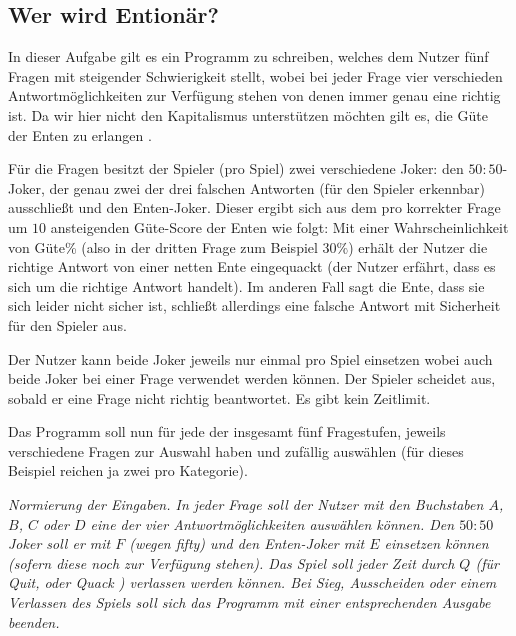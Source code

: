 \documentclass[table]{sopra-base}
\begin{document}
\subsection{Wer wird Entionär?}

In dieser Aufgabe gilt es ein Programm zu schreiben, welches dem Nutzer fünf Fragen mit steigender Schwierigkeit stellt, wobei bei jeder Frage vier verschieden Antwortmöglichkeiten zur Verfügung stehen
von denen immer genau eine richtig ist. Da wir hier nicht den Kapitalismus unterstützen möchten gilt es, die Güte der Enten zu erlangen \Tongey.\par{}
Für die Fragen besitzt der Spieler (pro Spiel) zwei verschiedene Joker: den $50:50$-Joker, der genau zwei der drei falschen Antworten (für den Spieler erkennbar) ausschließt und den Enten-Joker. Dieser ergibt sich aus dem pro korrekter Frage um $10$ ansteigenden Güte-Score der Enten wie folgt: Mit einer Wahrscheinlichkeit von Güte\% (also in der dritten Frage zum Beispiel $30\%$) erhält der Nutzer die richtige Antwort von einer netten Ente eingequackt (der Nutzer erfährt, dass es sich um die richtige Antwort handelt). Im anderen Fall sagt die Ente, dass sie sich leider nicht sicher ist, schließt allerdings eine falsche Antwort mit Sicherheit für den Spieler aus. \par{}
Der Nutzer kann beide Joker jeweils nur einmal pro Spiel einsetzen wobei auch beide Joker bei einer Frage
verwendet werden können. Der Spieler scheidet aus, sobald er eine Frage nicht richtig beantwortet. Es gibt kein Zeitlimit.\par{}

Das Programm soll nun für jede der insgesamt fünf Fragestufen, jeweils verschiedene Fragen zur Auswahl haben und zufällig auswählen (für dieses Beispiel reichen ja zwei pro Kategorie).\par{}

\textit{Normierung der Eingaben. In jeder Frage soll der Nutzer mit den Buchstaben $A$, $B$, $C$ oder $D$ eine der vier Antwortmöglichkeiten auswählen können. Den $50:50$ Joker soll er mit $F$ (wegen fifty) und den Enten-Joker mit $E$ einsetzen können (sofern diese noch zur Verfügung stehen). Das Spiel soll jeder Zeit durch $Q$ (für Quit, oder Quack \Tongey) verlassen werden können. Bei Sieg, Ausscheiden oder einem Verlassen des Spiels soll sich das Programm mit einer entsprechenden Ausgabe beenden.}
\end{document}
